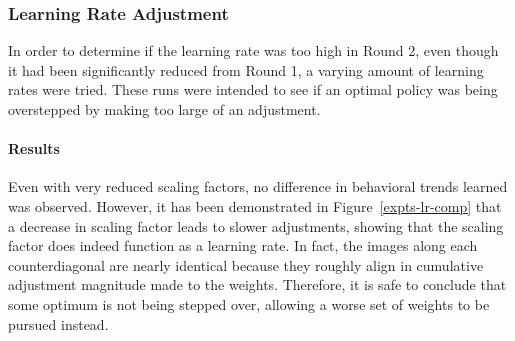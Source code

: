 
\subsubsection*{Learning Rate Adjustment}
\label{sec:findings-expts-learnrate}

In order to determine if the learning rate was too high in Round 2,
even though it had been significantly reduced from Round 1,
a varying amount of learning rates were tried.
%
These runs were intended to see if an optimal policy was being overstepped by
making too large of an adjustment.


\paragraph*{Results}


Even with very reduced scaling factors,
no difference in behavioral trends learned
was observed.
%
However,
it has been demonstrated in Figure~\ref{expts-lr-comp} that
a decrease in scaling factor leads to slower adjustments,
showing that the scaling factor does indeed function as a learning rate.
%
In fact,
the images along each counterdiagonal
are nearly identical
because they roughly align in
cumulative adjustment magnitude made to the weights.
%
Therefore,
it is safe to conclude that some optimum is not being stepped over,
allowing a worse set of weights to be pursued instead.



